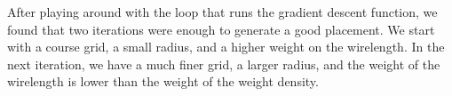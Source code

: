 \documentclass[9pt]{extarticle}
\begin{document}
\begin{homeworkProblem}
    
    After playing around with the loop that runs the gradient descent function, we found that two iterations were enough to generate a good placement. We start with a course grid, a small radius, and a higher weight on the wirelength. In the next iteration, we have a much finer grid, a larger radius, and the weight of the wirelength is lower than the weight of the weight density.  

\end{homeworkProblem}

\end{document}
